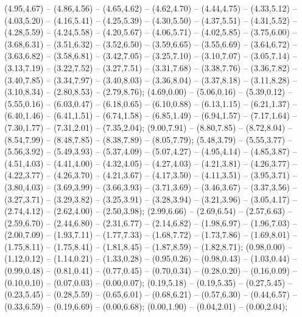 { (4.95,4.67) -- (4.86,4.56) -- (4.65,4.62) -- (4.62,4.70) -- (4.44,4.75) -- (4.33,5.12) -- (4.03,5.20) -- (4.16,5.41) -- (4.25,5.39) -- (4.30,5.50) -- (4.37,5.51) -- (4.31,5.52) -- (4.28,5.59) -- (4.24,5.58) -- (4.20,5.67) -- (4.06,5.71) -- (4.02,5.85) -- (3.75,6.00) -- (3.68,6.31) -- (3.51,6.32) -- (3.52,6.50) -- (3.59,6.65) -- (3.55,6.69) -- (3.64,6.72) -- (3.63,6.82) -- (3.58,6.81) -- (3.42,7.05) -- (3.25,7.10) -- (3.10,7.07) -- (3.05,7.14) -- (3.13,7.19) -- (3.22,7.52) -- (3.27,7.51) -- (3.31,7.68) -- (3.38,7.76) -- (3.36,7.82) -- (3.40,7.85) -- (3.34,7.97) -- (3.40,8.03) -- (3.36,8.04) -- (3.37,8.18) -- (3.11,8.28) -- (3.10,8.34) -- (2.80,8.53) -- (2.79,8.76);
 (4.69,0.00) -- (5.06,0.16) -- (5.39,0.12) -- (5.55,0.16) -- (6.03,0.47) -- (6.18,0.65) -- (6.10,0.88) -- (6.13,1.15) -- (6.21,1.37) -- (6.40,1.46) -- (6.41,1.51) -- (6.74,1.58) -- (6.85,1.49) -- (6.94,1.57) -- (7.17,1.64) -- (7.30,1.77) -- (7.31,2.01) -- (7.35,2.04);
 (9.00,7.91) -- (8.80,7.85) -- (8.72,8.04) -- (8.54,7.99) -- (8.48,7.85) -- (8.38,7.89) -- (8.05,7.79);
 (5.48,3.79) -- (5.55,3.77) -- (5.56,3.92) -- (5.49,3.93) -- (5.37,4.09) -- (5.07,4.27) -- (4.95,4.14) -- (4.85,3.87) -- (4.51,4.03) -- (4.41,4.00) -- (4.32,4.05) -- (4.27,4.03) -- (4.21,3.81) -- (4.26,3.77) -- (4.22,3.77) -- (4.26,3.70) -- (4.21,3.67) -- (4.17,3.50) -- (4.11,3.51) -- (3.95,3.71) -- (3.80,4.03) -- (3.69,3.99) -- (3.66,3.93) -- (3.71,3.69) -- (3.46,3.67) -- (3.37,3.56) -- (3.27,3.71) -- (3.29,3.82) -- (3.25,3.91) -- (3.28,3.94) -- (3.21,3.96) -- (3.05,4.17) -- (2.74,4.12) -- (2.62,4.00) -- (2.50,3.98);
 (2.99,6.66) -- (2.69,6.54) -- (2.57,6.63) -- (2.59,6.70) -- (2.44,6.80) -- (2.31,6.77) -- (2.14,6.82) -- (1.98,6.97) -- (1.96,7.03) -- (2.00,7.09) -- (1.93,7.11) -- (1.77,7.33) -- (1.68,7.72) -- (1.73,7.86) -- (1.69,8.01) -- (1.75,8.11) -- (1.75,8.41) -- (1.81,8.45) -- (1.87,8.59) -- (1.82,8.71);
 (0.98,0.00) -- (1.12,0.12) -- (1.14,0.21) -- (1.33,0.28) -- (0.95,0.26) -- (0.98,0.43) -- (1.03,0.44) -- (0.99,0.48) -- (0.81,0.41) -- (0.77,0.45) -- (0.70,0.34) -- (0.28,0.20) -- (0.16,0.09) -- (0.10,0.10) -- (0.07,0.03) -- (0.00,0.07);
 (0.19,5.18) -- (0.19,5.35) -- (0.27,5.45) -- (0.23,5.45) -- (0.28,5.59) -- (0.65,6.01) -- (0.68,6.21) -- (0.57,6.30) -- (0.44,6.57) -- (0.33,6.59) -- (0.19,6.69) -- (0.00,6.68);
 (0.00,1.90) -- (0.04,2.01) -- (0.00,2.04);
}
